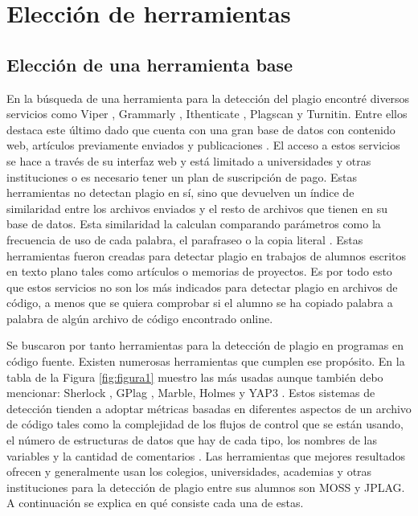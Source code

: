 \chapter{Elección de herramientas}

\section{Elección de una herramienta base}
En la búsqueda de una herramienta para la detección del plagio encontré diversos servicios como Viper \cite{viper}, Grammarly \cite{grammarly}, Ithenticate \cite{ithenticate}, Plagscan \cite{plagscan} y Turnitin. Entre ellos destaca este último dado que cuenta con una gran base de datos con contenido web, artículos previamente enviados y publicaciones \cite{turnitin}.
\newline
El acceso a estos servicios se hace a través de su interfaz web y está limitado a universidades y otras instituciones o es necesario tener un plan de suscripción de pago.
\newline
Estas herramientas no detectan plagio en sí, sino que devuelven un índice de similaridad entre los archivos enviados y el resto de archivos que tienen en su base de datos.
\newline
Esta similaridad la calculan comparando parámetros como la frecuencia de uso de cada palabra, el parafraseo o la copia literal \cite{plagio_estrategias}.
\newline
Estas herramientas fueron creadas para detectar plagio en trabajos de alumnos escritos en texto plano tales como artículos o memorias de proyectos.
\newline
Es por todo esto que estos servicios no son los más indicados para detectar plagio en archivos de código, a menos que se quiera comprobar si el alumno se ha copiado palabra a palabra de algún archivo de código encontrado online.

\bigskip

Se buscaron por tanto herramientas para la detección de plagio en programas en código fuente.
Existen numerosas herramientas que cumplen ese propósito. En la tabla de la Figura \ref{fig:figura1} muestro las más usadas aunque también debo mencionar: Sherlock \cite{sherlock}, GPlag \cite{gplag}, Marble, Holmes \cite{Moss_Jplag_info} y YAP3 \cite{yap3}. 
\newline
Estos sistemas de detección tienden a adoptar métricas basadas en diferentes aspectos de un archivo de código tales como la complejidad de los flujos de control que se están usando, el número de estructuras de datos que hay de cada tipo, los nombres de las variables y la cantidad de comentarios \cite{plagio_estrategias}.
\newline
Las herramientas que mejores resultados ofrecen y generalmente usan los colegios, universidades, academias y otras instituciones para la detección de plagio entre sus alumnos son MOSS y JPLAG.
\newline
\bigskip
A continuación se explica en qué consiste cada una de estas.



